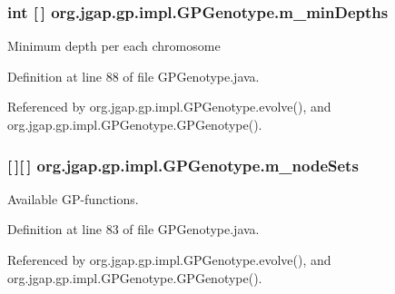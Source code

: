 \hypertarget{classorg_1_1jgap_1_1gp_1_1impl_1_1_g_p_genotype_af87aee9616f225ec99bf2f3db601e492}{
\subsubsection[{m\-\_\-min\-Depths}]{\setlength{\rightskip}{0pt plus 5cm}int \mbox{[}$\,$\mbox{]} org.\-jgap.\-gp.\-impl.\-G\-P\-Genotype.\-m\-\_\-min\-Depths\hspace{0.3cm}{\ttfamily [private]}}}\label{classorg_1_1jgap_1_1gp_1_1impl_1_1_g_p_genotype_af87aee9616f225ec99bf2f3db601e492}
Minimum depth per each chromosome 

Definition at line 88 of file G\-P\-Genotype.\-java.



Referenced by org.\-jgap.\-gp.\-impl.\-G\-P\-Genotype.\-evolve(), and org.\-jgap.\-gp.\-impl.\-G\-P\-Genotype.\-G\-P\-Genotype().

\hypertarget{classorg_1_1jgap_1_1gp_1_1impl_1_1_g_p_genotype_a045ec05f97be18ddbd121eb709d3e450}{
\subsubsection[{m\-\_\-node\-Sets}]{ \mbox{[}$\,$\mbox{]}\mbox{[}$\,$\mbox{]} org.\-jgap.\-gp.\-impl.\-G\-P\-Genotype.\-m\-\_\-node\-Sets\hspace{0.3cm}{\ttfamily [private]}}}\label{classorg_1_1jgap_1_1gp_1_1impl_1_1_g_p_genotype_a045ec05f97be18ddbd121eb709d3e450}
Available G\-P-\/functions. 

Definition at line 83 of file G\-P\-Genotype.\-java.



Referenced by org.\-jgap.\-gp.\-impl.\-G\-P\-Genotype.\-evolve(), and org.\-jgap.\-gp.\-impl.\-G\-P\-Genotype.\-G\-P\-Genotype().


